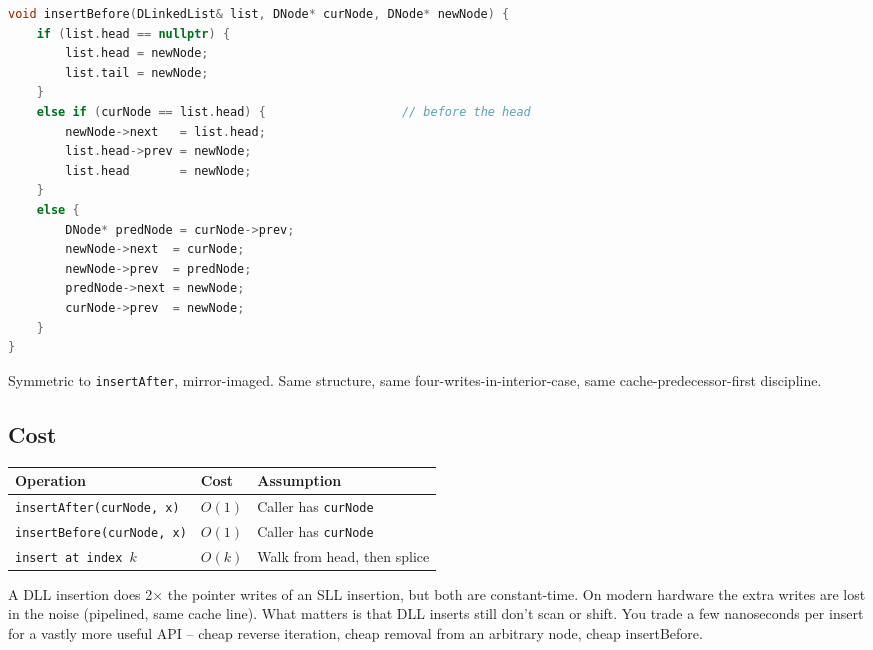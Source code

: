 \documentclass[11pt]{article}
\begin{document}
\begin{examplebox}
\begin{lstlisting}[basicstyle=\ttfamily\small,frame=single,language=C++]
void insertBefore(DLinkedList& list, DNode* curNode, DNode* newNode) {
    if (list.head == nullptr) {
        list.head = newNode;
        list.tail = newNode;
    }
    else if (curNode == list.head) {                   // before the head
        newNode->next   = list.head;
        list.head->prev = newNode;
        list.head       = newNode;
    }
    else {
        DNode* predNode = curNode->prev;
        newNode->next  = curNode;
        newNode->prev  = predNode;
        predNode->next = newNode;
        curNode->prev  = newNode;
    }
}
\end{lstlisting}
Symmetric to \texttt{insertAfter}, mirror-imaged. Same structure,
same four-writes-in-interior-case, same cache-predecessor-first
discipline.
\end{examplebox}

\subsection{Cost}

\begin{center}
\footnotesize
\renewcommand{\arraystretch}{1.3}
\begin{tabular}{@{}lll@{}}
\hline
\textbf{Operation}                   & \textbf{Cost} & \textbf{Assumption} \\
\hline
\texttt{insertAfter(curNode, x)}     & $O(1)$        & Caller has \texttt{curNode} \\
\texttt{insertBefore(curNode, x)}    & $O(1)$        & Caller has \texttt{curNode} \\
\texttt{insert at index $k$}          & $O(k)$        & Walk from head, then splice \\
\hline
\end{tabular}
\end{center}

\begin{warnbox}
A DLL insertion does 2$\times$ the pointer writes of an SLL
insertion, but both are constant-time. On modern hardware the extra
writes are lost in the noise (pipelined, same cache line). What
matters is that DLL inserts still don't scan or shift. You trade a
few nanoseconds per insert for a vastly more useful API -- cheap
reverse iteration, cheap removal from an arbitrary node, cheap
insertBefore.
\end{warnbox}
\end{document}
